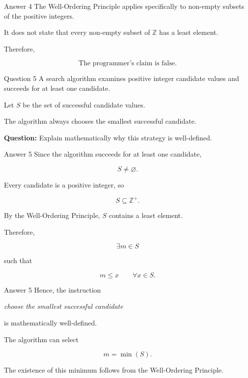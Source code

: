 \begin{frame}{Answer 4}
The Well-Ordering Principle applies specifically to non-empty subsets of the positive integers.

It does not state that every non-empty subset of $\mathbb{Z}$ has a least element.

Therefore,

$$
\boxed{\text{The programmer's claim is false.}}
$$

\end{frame}


\begin{frame}{Question 5}
A search algorithm examines positive integer candidate values and succeeds for at least one candidate.

Let $S$ be the set of successful candidate values.

The algorithm always chooses the smallest successful candidate.

\textbf{Question:} Explain mathematically why this strategy is well-defined.
\end{frame}

\begin{frame}{Answer 5}
Since the algorithm succeeds for at least one candidate,

$$
S\neq\varnothing.
$$

Every candidate is a positive integer, so

$$
S\subseteq\mathbb{Z}^+.
$$

By the Well-Ordering Principle, $S$ contains a least element.

Therefore,

$$
\exists m\in S
$$

such that

$$
m\leq x
\qquad\forall x\in S.
$$

\end{frame}

\begin{frame}{Answer 5}
Hence, the instruction

\textit{choose the smallest successful candidate}

is mathematically well-defined.

The algorithm can select

$$
\boxed{m=\min(S)}.
$$

The existence of this minimum follows from the Well-Ordering Principle.
\end{frame}
